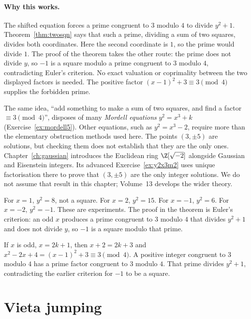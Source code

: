 \paragraph{Why this works.}
The shifted equation forces a prime congruent to $3$ modulo $4$ to divide $y^2+1$. Theorem~\ref{thm:twosqn} says that such a prime, dividing a sum of two squares, divides both coordinates. Here the second coordinate is $1$, so the prime would divide $1$. The proof of the theorem takes the other route: the prime does not divide $y$, so $-1$ is a square modulo a prime congruent to $3$ modulo $4$, contradicting Euler's criterion. No exact valuation or coprimality between the two displayed factors is needed. The positive factor $(x-1)^2+3\equiv3\pmod4$ supplies the forbidden prime.

The same idea, ``add something to make a sum of two squares, and find a factor $\equiv3\pmod4$'', disposes of many \emph{Mordell equations} $y^2=x^3+k$ (Exercise~\ref{ex:mordell5}). Other equations, such as $y^2=x^3-2$, require more than the elementary obstruction methods used here. The points $(3,\pm5)$ are solutions, but checking them does not establish that they are the only ones. Chapter~\ref{ch:gaussian} introduces the Euclidean ring $\Z[\sqrt{-2}]$ alongside Gaussian and Eisenstein integers. Its advanced Exercise~\ref{ex:y2x3m2} uses unique factorisation there to prove that $(3,\pm5)$ are the only integer solutions. We do not assume that result in this chapter; Volume~13 develops the wider theory.

\begin{examplex}[why $y^2=x^3+7$ fails for small $x$]
For $x=1$, $y^2=8$, not a square. For $x=2$, $y^2=15$. For $x=-1$, $y^2=6$. For $x=-2$, $y^2=-1$. These are experiments. The proof in the theorem is Euler's criterion: an odd $x$ produces a prime congruent to $3$ modulo $4$ that divides $y^2+1$ and does not divide $y$, so $-1$ is a square modulo that prime.
\end{examplex}

\begin{examplex}
If $x$ is odd, $x=2k+1$, then $x+2=2k+3$ and $x^2-2x+4=(x-1)^2+3\equiv 3\pmod 4$. A positive integer congruent to $3$ modulo $4$ has a prime factor congruent to $3$ modulo $4$. That prime divides $y^2+1$, contradicting the earlier criterion for $-1$ to be a square.
\end{examplex}

\section{Vieta jumping}

